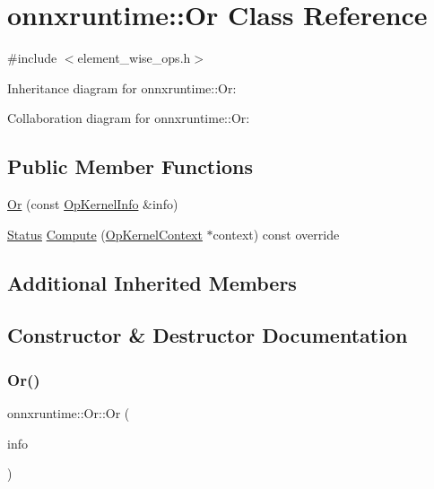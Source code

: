 \hypertarget{classonnxruntime_1_1Or}{}\section{onnxruntime\+:\+:Or Class Reference}
\label{classonnxruntime_1_1Or}


{\ttfamily \#include $<$element\+\_\+wise\+\_\+ops.\+h$>$}



Inheritance diagram for onnxruntime\+:\+:Or\+:


Collaboration diagram for onnxruntime\+:\+:Or\+:
\subsection*{Public Member Functions}
\begin{DoxyCompactItemize}
\item 
\mbox{\hyperlink{classonnxruntime_1_1Or_aef2a88af627cff2e22b93b5ed0afc622}{Or}} (const \mbox{\hyperlink{classonnxruntime_1_1OpKernelInfo}{Op\+Kernel\+Info}} \&info)
\item 
\mbox{\hyperlink{classonnxruntime_1_1common_1_1Status}{Status}} \mbox{\hyperlink{classonnxruntime_1_1Or_af4b545cf032db5924efe3f2bbb2803d5}{Compute}} (\mbox{\hyperlink{classonnxruntime_1_1OpKernelContext}{Op\+Kernel\+Context}} $\ast$context) const override
\end{DoxyCompactItemize}
\subsection*{Additional Inherited Members}


\subsection{Constructor \& Destructor Documentation}
\mbox{\label{classonnxruntime_1_1Or_aef2a88af627cff2e22b93b5ed0afc622}} 
\subsubsection{\texorpdfstring{Or()}{Or()}}
{\footnotesize\ttfamily onnxruntime\+::\+Or\+::\+Or (\begin{DoxyParamCaption}\item[{const \mbox{\hyperlink{classonnxruntime_1_1OpKernelInfo}{Op\+Kernel\+Info}} \&}]{info }\end{DoxyParamCaption})\hspace{0.3cm}{\ttfamily [inline]}}



